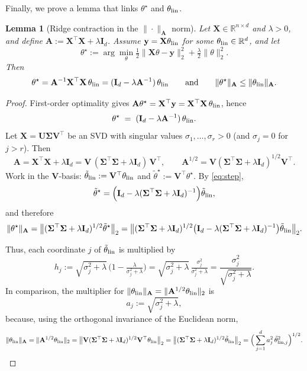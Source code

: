 \documentclass{article}
\newtheorem{lemma}[theorem]{Lemma}
\def\amat{\mathbf{A}}
\def\xmat{\mathbf{X}}
\def\imat{\mathbf{I}}
\def\yvec{\mathbf{y}}
\newcommand{\1}{\mathbbm{1}}
\begin{document}
Finally, we prove a lemma that links $\theta^\star$ and $\theta_{\rm lin}$.


\begin{lemma}[Ridge contraction in the $\|\cdot\|_{\amat}$ norm]\label{lem:ridge-contraction}
Let $\xmat\in\mathbb{R}^{n\times d}$ and $\lambda>0$, and define $\amat := \xmat^\top\xmat + \lambda\imat_d$.
Assume $\yvec = \xmat\theta_{\rm lin}$ for some $\theta_{\rm lin}\in\mathbb{R}^d$, and let
\[
\theta^\star := \arg\min_\theta \tfrac12\|\xmat\theta-\yvec\|_2^2 + \tfrac{\lambda}{2}\|\theta\|_2^2.
\]
Then
\[
\theta^\star = \amat^{-1}\xmat^\top\xmat\,\theta_{\rm lin}
= (\imat_d - \lambda\amat^{-1})\,\theta_{\rm lin}
\qquad\text{and}\qquad
\|\theta^\star\|_{\amat} \le \|\theta_{\rm lin}\|_{\amat}.
\]
\end{lemma}

\begin{proof}
First-order optimality gives $\amat\theta^\star=\xmat^\top\yvec=\xmat^\top\xmat\,\theta_{\rm lin}$, hence
\begin{equation}\label{eq:step}
\theta^\star \;=\; (\imat_d - \lambda\amat^{-1})\,\theta_{\rm lin}.
\end{equation}
Let $\xmat=\mathbf{U}\mathbf{\Sigma}\mathbf{V}^\top$ be an SVD with singular values $\sigma_1,\dots,\sigma_r>0$ (and $\sigma_j=0$ for $j>r$).
Then
\[
\amat=\xmat^\top\xmat+\lambda\imat_d
= \mathbf{V}\,(\mathbf{\Sigma}^\top\mathbf{\Sigma}+\lambda\imat_d)\,\mathbf{V}^\top,
\qquad
\amat^{1/2}=\mathbf{V}(\mathbf{\Sigma}^\top\mathbf{\Sigma}+\lambda\imat_d)^{1/2}\mathbf{V}^\top.
\]
Work in the $\mathbf{V}$-basis: $\tilde\theta_{\rm lin}:=\mathbf{V}^\top\theta_{\rm lin}$ and $\tilde\theta^\star:=\mathbf{V}^\top\theta^\star$.
By \eqref{eq:step},
\[
\tilde\theta^\star
= \Big(\imat_d-\lambda(\mathbf{\Sigma}^\top\mathbf{\Sigma}+\lambda\imat_d)^{-1}\Big)\tilde\theta_{\rm lin},
\]
and therefore
\[
\|\theta^\star\|_{\amat}
= \big\|(\mathbf{\Sigma}^\top\mathbf{\Sigma}+\lambda\imat_d)^{1/2}\tilde\theta^\star\big\|_2
= \big\|(\mathbf{\Sigma}^\top\mathbf{\Sigma}+\lambda\imat_d)^{1/2}
\big(\imat_d-\lambda(\mathbf{\Sigma}^\top\mathbf{\Sigma}+\lambda\imat_d)^{-1}\big)\tilde\theta_{\rm lin}\big\|_2.
\]

Thus, each coordinate $j$ of $\tilde\theta_{\rm lin}$ is multiplied by
\[
h_j
:= \sqrt{\sigma_j^2+\lambda}\,\Big(1-\tfrac{\lambda}{\sigma_j^2+\lambda}\Big)
= \sqrt{\sigma_j^2+\lambda}\,\tfrac{\sigma_j^2}{\sigma_j^2+\lambda}
= \frac{\sigma_j^2}{\sqrt{\sigma_j^2+\lambda}}.
\]
In comparison, the multiplier for $\|\theta_{\rm lin}\|_{\amat}
=\|\amat^{1/2}\theta_{\rm lin}\|_2$ is
\[
a_j:=\sqrt{\sigma_j^2+\lambda},
\]
because, using the orthogonal invariance of the Euclidean norm,
\[
\|\theta_{\rm lin}\|_{\amat}
=\|\amat^{1/2}\theta_{\rm lin}\|_2
=\big\|\mathbf{V}(\mathbf{\Sigma}^\top\mathbf{\Sigma}+\lambda\imat_d)^{1/2}\mathbf{V}^\top\theta_{\rm lin}\big\|_2
=\big\|(\mathbf{\Sigma}^\top\mathbf{\Sigma}+\lambda\imat_d)^{1/2}\tilde\theta_{\rm lin}\big\|_2
=\Big(\sum_{j=1}^d a_j^2\,\tilde\theta_{{\rm lin},j}^2\Big)^{1/2}.
\]


\end{proof}
\end{document}
